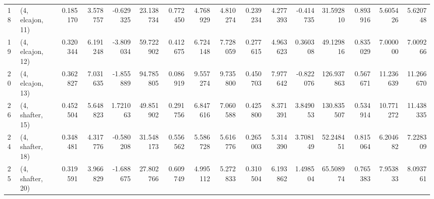 \begin{tabular}{llrrrrrrrrrrrrrr}
18 &  (4, elcajon, 11) &   0.185170 &  3.578757 & -0.629325 &   23.138734 &  0.772450 &   4.768929 &   4.810274 &  0.239234 &   4.277393 & -0.414735 &   31.592810 &  0.893916 &   5.605426 &   5.620748 \\
19 &  (4, elcajon, 12) &   0.320344 &  6.191248 & -3.809034 &   59.722902 &  0.412675 &   6.724148 &   7.728059 &  0.277615 &   4.963623 &  0.360308 &   49.129816 &  0.835029 &   7.000000 &   7.009266 \\
20 &  (4, elcajon, 13) &   0.362827 &  7.031635 & -1.855889 &   94.785805 &  0.086919 &   9.557274 &   9.735800 &  0.450703 &   7.977642 & -0.822076 &  126.937863 &  0.567671 &  11.236639 &  11.266670 \\
26 &  (4, shafter, 15) &   0.452504 &  5.648823 &  1.721063 &   49.851902 &  0.291756 &   6.847616 &   7.060588 &  0.425800 &   8.371391 &  3.849053 &  130.835507 &  0.534914 &  10.771272 &  11.438335 \\
24 &  (4, shafter, 18) &   0.348481 &  4.317776 & -0.580208 &   31.548173 &  0.556562 &   5.586728 &   5.616776 &  0.265003 &   5.314390 &  3.708149 &   52.248451 &  0.815064 &   6.204682 &   7.228309 \\
25 &  (4, shafter, 20) &   0.319591 &  3.966829 & -1.688675 &   27.802766 &  0.609749 &   4.995112 &   5.272833 &  0.310504 &   6.193862 &  1.498504 &   65.508974 &  0.765383 &   7.953833 &   8.093761 \\
\bottomrule
\end{tabular}
